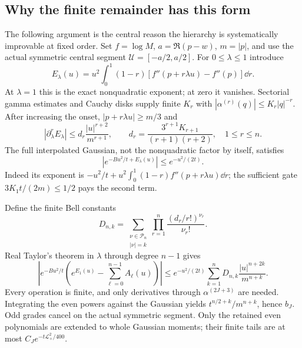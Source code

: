 \subsection{Why the finite remainder has this form}
The following argument is the central reason the hierarchy is
systematically improvable at fixed order. Set $f=\log M$,
$a=\Re(p-w)$, $m=|p|$, and use the actual symmetric central segment
$\mathcal U=[-a/2,a/2]$. For $0\le\lambda\le1$ introduce
\begin{equation}
 E_\lambda(u)=u^2\int_0^1(1-r)
                  [f''(p+r\lambda u)-f''(p)]\dd r.
 \label{eq:interpolation}
\end{equation}
At $\lambda=1$ this is the exact nonquadratic exponent; at zero it
vanishes. Sectorial gamma estimates and Cauchy disks supply finite
$K_r$ with $|\alpha^{(r)}(q)|\le K_r|q|^{-r}$. After increasing the
onset, $|p+r\lambda u|\ge m/3$ and
\begin{equation}
 |\partial_\lambda^rE_\lambda|
 \le d_r\frac{|u|^{r+2}}{m^{r+1}},\qquad
 d_r=\frac{3^{r+1}K_{r+1}}{(r+1)(r+2)},\quad1\le r\le n.
 \label{eq:lambda-derivatives}
\end{equation}
The full interpolated Gaussian, not the nonquadratic factor by itself,
satisfies
\begin{equation}
 |e^{-Bu^2/t+E_\lambda(u)}|\le e^{-u^2/(2t)}.
 \label{eq:common-gaussian}
\end{equation}
Indeed its exponent is $-u^2/t+u^2\int_0^1(1-r)f''(p+r\lambda u)\dd r$;
the sufficient gate $3K_1t/(2m)\le1/2$ pays the second term.

Define the finite Bell constants
\[
 D_{n,k}=\sum_{\substack{\nu\in\mathcal P_n\\|\nu|=k}}
                   \prod_{r=1}^n\frac{(d_r/r!)^{\nu_r}}{\nu_r!}.
\]
Real Taylor's theorem in $\lambda$ through degree $n-1$ gives
\begin{equation}
 \left|e^{-Bu^2/t}\left(e^{E_1(u)}-\sum_{\ell=0}^{n-1}A_\ell(u)\right)\right|
 \le e^{-u^2/(2t)}\sum_{k=1}^nD_{n,k}
                            \frac{|u|^{n+2k}}{m^{n+k}}.
 \label{eq:bell-remainder}
\end{equation}
Every operation is finite, and only derivatives through
$\alpha^{(2J+3)}$ are needed. Integrating the even powers against
the Gaussian yields $t^{n/2+k}/m^{n+k}$, hence $b_J$.
Odd grades cancel on the actual symmetric segment. Only the retained
even polynomials are extended to whole Gaussian moments; their finite
tails are at most $C_J e^{-t\mathcal L_+^2/400}$.

